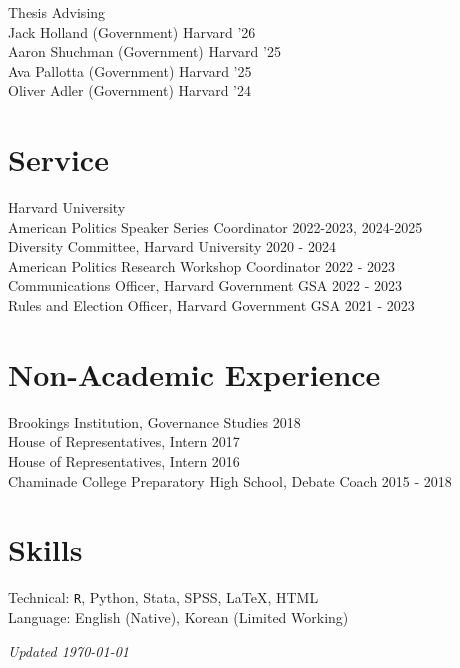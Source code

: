 \documentclass[margin, line]{res}
\begin{document}
\begin{resume}
\hspace*{2.5mm} Thesis Advising \\
\hspace*{5mm} Jack Holland (Government) \hfill Harvard '26\\
\hspace*{5mm} Aaron Shuchman (Government) \hfill Harvard '25\\
\hspace*{5mm} Ava Pallotta (Government) \hfill Harvard '25\\
\hspace*{5mm} Oliver Adler (Government) \hfill Harvard '24

\section{Service}
Harvard University\\
\hspace*{5mm} American Politics Speaker Series Coordinator \hfill 2022-2023, 2024-2025\\
\hspace*{5mm} Diversity Committee, Harvard University \hfill 2020 - 2024\\
\hspace*{5mm} American Politics Research Workshop Coordinator \hfill 2022 - 2023\\
\hspace*{5mm} Communications Officer, Harvard Government GSA \hfill 2022 - 2023\\
\hspace*{5mm} Rules and Election Officer, Harvard Government GSA \hfill 2021 - 2023\\

\section{Non-Academic Experience}
Brookings Institution, Governance Studies \hfill 2018\\
House of Representatives, Intern \hfill 2017\\
House of Representatives, Intern \hfill 2016\\
Chaminade College Preparatory High School, Debate Coach \hfill 2015 - 2018

\section{Skills}
Technical: \texttt{R}, Python, Stata, SPSS, \LaTeX, HTML\\
Language: English (Native), Korean (Limited Working)

\vspace*{\fill}

\hfill \small{\textit{Updated \today}}

\end{resume}
\end{document}
